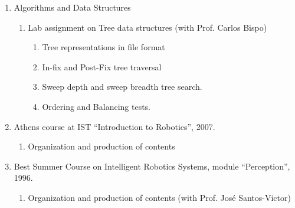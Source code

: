 \begin{enumerate}
  \begin{enumerate}
  \def\labelenumii{\alph{enumii}.}
  \item
    Lab assignment of ``Cell Automation for Quality Control'' (with
    Prof. Paulo Oliveira):

    \begin{enumerate}
    \def\labelenumiii{\roman{enumiii}.}
    \item
      Assembly of a Cell composed of Conveyor Belts (3), Robot
      Manipulators (2), proximity and defect sensors (5), push actuators
      (2).
    \item
      Modeling and Analysis of the Cell using Discrete Event Systems
    \item
      Trajectory Programming for a Robotic Manipulator
    \item
      Cell programming in GRAFCET using a PLC's
    \end{enumerate}
  \end{enumerate}
\item
  Algorithms and Data Structures

  \begin{enumerate}
  \def\labelenumii{\alph{enumii}.}
  \item
    Lab assignment on Tree data structures (with Prof. Carlos Bispo)

    \begin{enumerate}
    \def\labelenumiii{\roman{enumiii}.}
    \item
      Tree representations in file format
    \item
      In-fix and Post-Fix tree traversal
    \item
      Sweep depth and sweep breadth tree search.
    \item
      Ordering and Balancing tests.
    \end{enumerate}
  \end{enumerate}
\item
  Athens course at IST ``Introduction to Robotics'', 2007.

  \begin{enumerate}
  \def\labelenumii{\alph{enumii}.}
  \item
    Organization and production of contents
  \end{enumerate}
\item
  Best Summer Course on Intelligent Robotics Systems, module
  ``Perception'', 1996.

  \begin{enumerate}
  \def\labelenumii{\alph{enumii}.}
  \item
    Organization and production of contents (with Prof. José
    Santos-Victor)
  \end{enumerate}
\end{enumerate}
